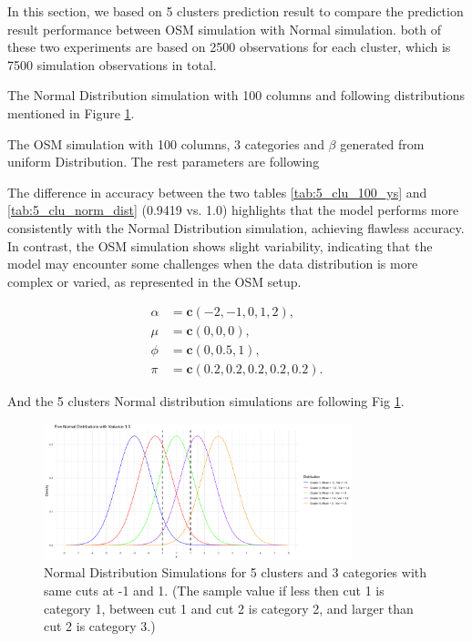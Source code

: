 \documentclass{article}
\begin{document}
In this section, we based on 5 clusters prediction result to compare the prediction result performance between OSM simulation with Normal simulation.
both of these two experiments are based on 2500 observations for each cluster, which is 7500 simulation observations in total. 

The Normal Distribution simulation with 100 columns and following distributions mentioned in Figure \ref{fig:dist_5_clus}.

The OSM simulation with 100 columns, 3 categories and $\beta$ generated from uniform Distribution. The rest parameters are following

The difference in accuracy between the two tables \ref*{tab:5_clu_100_ys} and \ref*{tab:5_clu_norm_dist} (0.9419 vs. 1.0) highlights that the model performs more consistently with the Normal Distribution simulation, achieving flawless accuracy. 
In contrast, the OSM simulation shows slight variability, indicating that the model may encounter some challenges when the data distribution is more complex or varied, as represented in the OSM setup.

\[
\begin{aligned}
\alpha &= \mathbf{c}(-2, -1, 0, 1, 2), \\
\mu &= \mathbf{c}(0, 0, 0), \\
\phi &= \mathbf{c}(0, 0.5, 1), \\
\pi &= \mathbf{c}(0.2, 0.2, 0.2, 0.2, 0.2).
\end{aligned}
\]

And the 5 clusters Normal distribution simulations are following Fig \ref{fig:dist_5_clus}.

\begin{figure}[htbp!]
  \centering
  \includegraphics[width=0.8\textwidth]{images/dist_simu/dist_5_clusters.png}
  \caption{Normal Distribution Simulations for 5 clusters and 3 categories with same cuts at -1 and 1.
   (The sample value if less then cut 1 is category 1, between cut 1 and cut 2 is category 2, and larger than cut 2 is category 3.)
  }
  \label{fig:dist_5_clus}
\end{figure}
\end{document}

